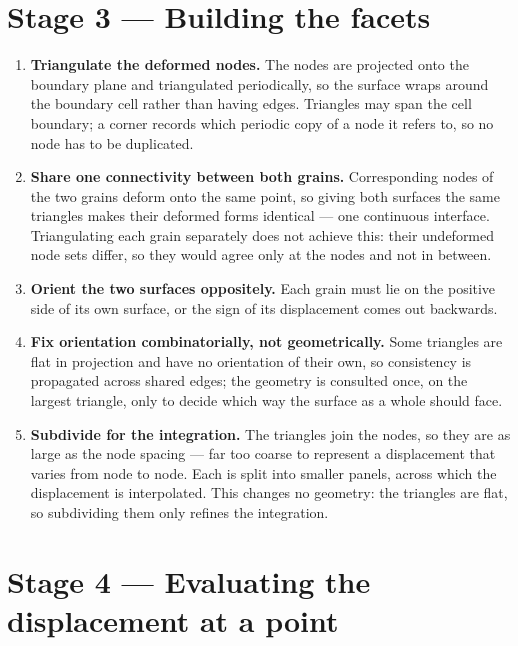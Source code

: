 \documentclass[11pt]{article}
\begin{document}
\section*{Stage 3 --- Building the facets}

\begin{enumerate}
  \item \textbf{Triangulate the deformed nodes.} The nodes are projected onto
        the boundary plane and triangulated periodically, so the surface wraps
        around the boundary cell rather than having edges. Triangles may span
        the cell boundary; a corner records which periodic copy of a node it
        refers to, so no node has to be duplicated.
  \item \textbf{Share one connectivity between both grains.} Corresponding nodes
        of the two grains deform onto the same point, so giving both surfaces
        the same triangles makes their deformed forms identical --- one
        continuous interface. Triangulating each grain separately does not
        achieve this: their undeformed node sets differ, so they would agree only
        at the nodes and not in between.
  \item \textbf{Orient the two surfaces oppositely.} Each grain must lie on the
        positive side of its own surface, or the sign of its displacement comes
        out backwards.
  \item \textbf{Fix orientation combinatorially, not geometrically.} Some
        triangles are flat in projection and have no orientation of their own, so
        consistency is propagated across shared edges; the geometry is consulted
        once, on the largest triangle, only to decide which way the surface as a
        whole should face.
  \item \textbf{Subdivide for the integration.} The triangles join the nodes, so
        they are as large as the node spacing --- far too coarse to represent a
        displacement that varies from node to node. Each is split into smaller
        panels, across which the displacement is interpolated. This changes no
        geometry: the triangles are flat, so subdividing them only refines the
        integration.
\end{enumerate}

\section*{Stage 4 --- Evaluating the displacement at a point}
\end{document}
